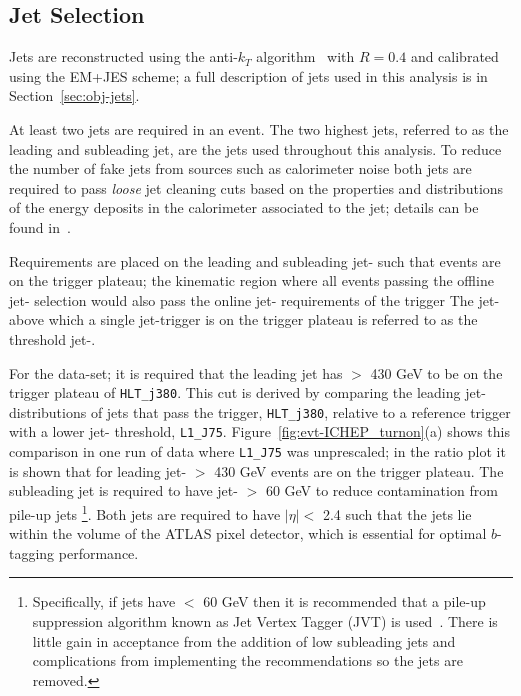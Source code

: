 \subsection{Jet Selection}
\label{sec:evt-sel-jets}

Jets are reconstructed using the anti-$k_T$ algorithm~\cite{obj-jets_reco_akt} with $R=0.4$
and calibrated using the EM+JES scheme;
a full description of jets used in this analysis is in Section~\ref{sec:obj-jets}.

At least two jets are required in an event.
The two highest \pT{} jets, referred to as the leading and subleading jet,
are the jets used throughout this analysis.
To reduce the number of fake jets from sources such as calorimeter noise
both jets are required to pass \textit{loose} jet cleaning cuts
based on the properties and distributions of the energy deposits in the calorimeter associated to the jet;
details can be found in~\cite{evt-jet_cleaning}.

Requirements are placed on  the leading and subleading jet-\pT{} such that events are on the trigger plateau;
the kinematic region where all events passing the offline jet-\pT{} selection
would also pass the online jet-\pT{} requirements of the trigger
The jet-\pT{} above which a single jet-trigger is on the trigger plateau is referred to as the threshold jet-\pT.

For the \summer{} data-set; it is required that the leading jet has \pT{} $>$ 430 GeV to be on the trigger plateau of \verb|HLT_j380|.
This cut is derived by comparing the leading jet-\pT{} distributions of jets that pass the trigger, \verb|HLT_j380|,
relative to a reference trigger with a lower jet-\pT{} threshold, \verb|L1_J75|.
Figure~\ref{fig:evt-ICHEP_turnon}(a) shows this comparison in one run of data where \verb|L1_J75| was unprescaled;
in the ratio plot it is shown that for leading jet-\pT{} $>$ 430 GeV events are on the trigger plateau.
The subleading jet is required to have jet-\pT{} $>$ 60 GeV
to reduce contamination from pile-up jets
\footnote{Specifically, if jets have \pT{} $<$ 60 GeV then it is recommended that
  a pile-up suppression algorithm known as Jet Vertex Tagger (JVT) is used~\cite{evt-jvt}.
  There is little gain in acceptance from the addition of low \pT{} subleading jets and
  complications from implementing the recommendations so the jets are removed. }.
Both jets  are required to have $|\eta| <$ 2.4
such that the jets lie within the volume of the ATLAS pixel detector,
which is essential for optimal $b$-tagging performance.

